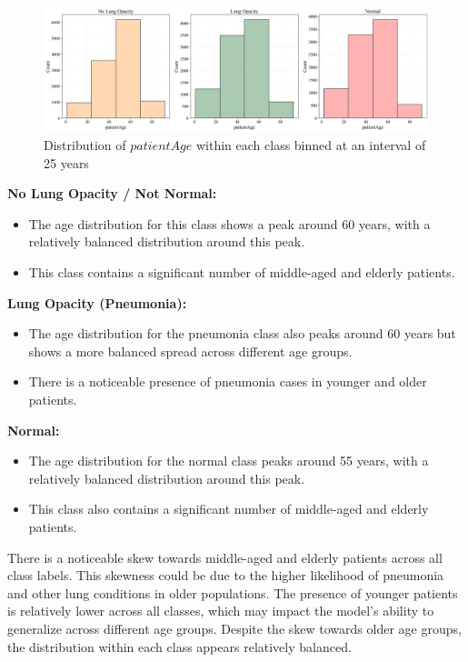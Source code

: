 \begin{figure}[H]
    \begin{center}
        \includegraphics[width = 1.0\textwidth]{figures/Figure6.png}
        \caption{Distribution of $patientAge$ within each class binned at an interval of 25 years}
        \label{fig:cha-2 figure4}
    \end{center}
\end{figure}

\textbf{No Lung Opacity / Not Normal:}
\begin{itemize}
    \item The age distribution for this class shows a peak around 60 years, with a relatively balanced distribution around this peak.
    \item This class contains a significant number of middle-aged and elderly patients.
\end{itemize}

\textbf{Lung Opacity (Pneumonia):}
\begin{itemize}
    \item The age distribution for the pneumonia class also peaks around 60 years but shows a more balanced spread across different age groups.
    \item There is a noticeable presence of pneumonia cases in younger and older patients.
\end{itemize}

\textbf{Normal:}
\begin{itemize}
    \item The age distribution for the normal class peaks around 55 years, with a relatively balanced distribution around this peak.
    \item This class also contains a significant number of middle-aged and elderly patients.
\end{itemize}

There is a noticeable skew towards middle-aged and elderly patients across all class labels. This skewness could be due to the higher likelihood of pneumonia and other lung conditions in older populations.
The presence of younger patients is relatively lower across all classes, which may impact the model's ability to generalize across different age groups. Despite the skew towards older age groups, the distribution within each class appears relatively balanced.

